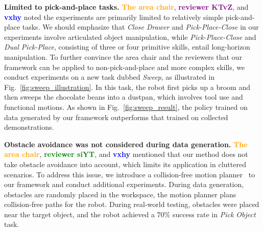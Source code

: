 \documentclass[conference]{IEEEtran}
\newcommand{\rssparagraph}[1]{{\bf #1.}}
\begin{document}
\rssparagraph{Limited to pick-and-place tasks}
\textbf{\textcolor{orange}{The area chair}}, \textbf{\textcolor{purple}{reviewer KTvZ}}, and \textbf{\textcolor{blue}{vxhy}} noted the experiments are primarily limited to relatively simple pick-and-place tasks. 
We should emphasize that \textit{Close Drawer} and \textit{Pick-Place-Close} in our experiments involve articulated object manipulation, while \textit{Pick-Place-Close} and \textit{Dual Pick-Place}, consisting of three or four primitive skills, entail long-horizon manipulation. 
To further convince the area chair and the reviewers that our framework can be applied to non-pick-and-place and more complex skills, we conduct experiments on a new task dubbed \textit{Sweep}, as illustrated in Fig.~\ref{fig:sweep_illustration}. 
In this task, the robot first picks up a broom and then sweeps the chocolate beans into a dustpan, which involves tool use and functional motions. 
As shown in Fig.~\ref{fig:sweep_result}, the policy trained on data generated by our framework outperforms that trained on collected demonstrations.

\rssparagraph{Obstacle avoidance was not considered during data generation}
\textbf{\textcolor{orange}{The area chair}}, \textbf{\textcolor{green}{reviewer siYT}}, and \textbf{\textcolor{blue}{vxhy}} mentioned that our method does not take obstacle avoidance into account, which limits its application in cluttered scenarios. 
To address this issue, we introduce a collision-free motion planner~\cite{curobo_report23} to our framework and conduct additional experiments. 
During data generation, obstacles are randomly placed in the workspace, the motion planner plans collision-free paths for the robot. 
During real-world testing, obstacles were placed near the target object, and the robot achieved a 70\% success rate in \textit{Pick Object} task.



\end{document}
